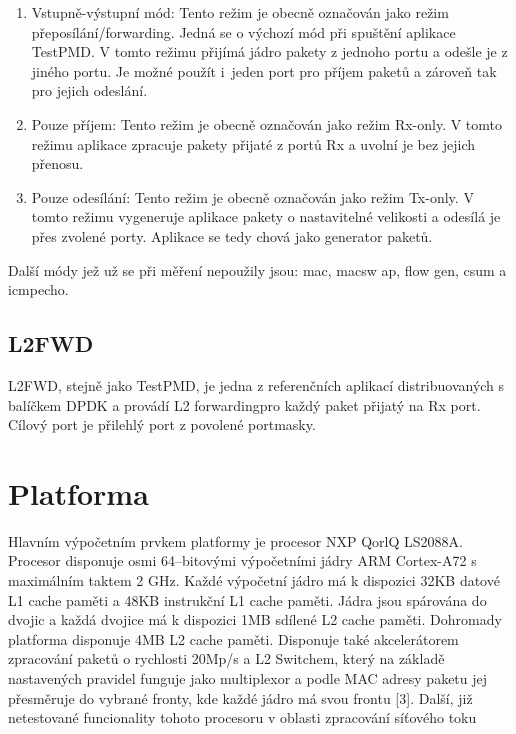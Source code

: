 \documentclass[11pt, titlepage, a4paper]{article}
\begin{document}
		\begin{enumerate}
		\item Vstupně-výstupní mód: Tento režim je obecně označován jako režim přeposílání/forwarding. Jedná se o výchozí mód při spuštění aplikace TestPMD.
		V tomto režimu přijímá jádro pakety z jednoho portu a odešle je z jiného portu. Je možné použít i~jeden port pro příjem paketů a zároveň tak pro jejich odeslání.
		\item Pouze příjem: Tento režim je obecně označován jako režim Rx-only. V tomto režimu aplikace zpracuje pakety přijaté z portů Rx a uvolní je bez jejich přenosu.
		\item Pouze odesílání: Tento režim je obecně označován jako režim Tx-only. V tomto režimu vygeneruje aplikace pakety o nastavitelné velikosti a odesílá je přes zvolené porty.
		Aplikace se tedy chová jako generator paketů.
		\end{enumerate}

		Další módy jež už se při měření nepoužily jsou: mac, macsw ap, flow gen, csum a icmpecho.


		\subsection{L2FWD}
		L2FWD, stejně jako TestPMD, je jedna z referenčních aplikací distribuovaných s balíčkem DPDK
		a provádí L2 forwarding\footnotemark[4] pro každý paket přijatý na Rx port. Cílový port je přilehlý port z povolené portmasky.


		\newpage
		\section{Platforma}

		Hlavním výpočetním prvkem platformy je procesor NXP QorlQ LS2088A. Procesor disponuje osmi 64--bitovými výpočetními jádry ARM Cortex-A72 s maximálním taktem 2 GHz. Každé
		výpočetní jádro má k dispozici 32KB datové L1 cache paměti a 48KB instrukční L1 cache paměti. Jádra jsou spárována do dvojic a každá dvojice má k dispozici 1MB sdílené L2 cache paměti.
		Dohromady platforma disponuje 4MB L2 cache paměti.  Disponuje také akcelerátorem zpracování paketů o rychlosti 20Mp/s a L2 Switchem, který na základě nastavených pravidel
		funguje jako multiplexor a podle MAC adresy paketu jej přesměruje do vybrané fronty, kde každé jádro má svou frontu [3].
		\newline
		\newline
		Další, již netestované funcionality tohoto procesoru v oblasti zpracování síťového toku
\end{document}
